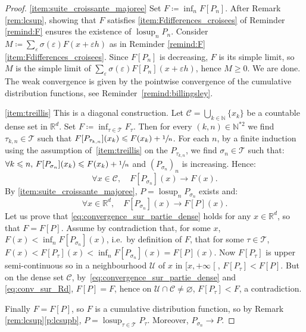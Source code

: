 \documentclass[10pt,a4paper]{article}
\providecommand{\skpt}{\smallskip}
\providecommand{\ie}{i.e.\ }
\theoremstyle{plain}
\theoremstyle{definition}
\newcommand{\Tt}{{\mathcal T}}
\newcommand{\eqdef}{\coloneqq}
\let\eps\varepsilon
\newcommand{\R}{\mathbb{R}}
\newcommand{\N}{\mathbb{N}}
\newcommand{\lcsup}{\operatorname{losup}}
\newcommand{\clo}{\mathclose}
\begin{document}
\skpt
\begin{proof}
\eqref{item:suite_croissante_majoree}
Set $F\eqdef\inf_nF[P_n]$. After Remark \ref{rem:lcsup}, showing that $F$ satisfies \eqref{item:Fdifferences_croisees} of Reminder \ref{remind:F} ensures the existence of $\lcsup_nP_n$. Consider $M\eqdef\sum_{\eps} \sigma(\eps) F(x+\eps h)$ as in Reminder \ref{remind:F}\eqref{item:Fdifferences_croisees}. Since $F[P_n]$ is decreasing, $F$ is its simple limit, so $M$ is the simple limit of $\sum_{\eps} \sigma(\eps) F[P_n](x+\eps h)$, hence $M\geqslant0$. We are done. The weak convergence is given by the pointwise convergence of the cumulative distribution functions, see Reminder~\ref{remind:billingsley}.

\eqref{item:treillis}
This is a diagonal construction. Let $\mathcal{C}=\bigcup_{k\in\N}\{x_k\}$ be a countable dense set in $\R^d$. Set $F\eqdef\inf_{\tau\in\Tt}F_\tau$. Then for every $(k,n)\in\N^{\ast2}$ we find $\tau_{k,n}\in \Tt$ such that $F[P_{\tau_{k,n}}](x_k)\leqslant F(x_k)+\sfrac1n$. For each $n$, by a finite induction using the assumption of~\eqref{item:treillis} on the $P_{\tau_{k,n}}$, we find $\sigma_{n}\in \Tt$ such that: $\forall k\leqslant n,\, F[P_{\sigma_{n}}](x_k)\leqslant F(x_k)+\sfrac1n$ and $(P_{\sigma_n})_n$ is increasing. Hence:
\begin{equation}\label{eq:convergence_sur_partie_dense}
\forall x\in \mathcal{C},\quad F[P_{\sigma_{n}}](x)\to F(x).
\end{equation}
By \eqref{item:suite_croissante_majoree}, $P=\lcsup_n P_{\sigma_n}$ exists and:
\begin{equation}\label{eq:conv_sur_Rd}
\forall x\in \R^d,\quad F[P_{\sigma_{n}}](x)\to F[P](x).
\end{equation}
Let us prove that \eqref{eq:convergence_sur_partie_dense} holds for any $x\in\R^d$, so that $F=F[P]$. Assume by contradiction that, for some $x$, $F(x)<\inf_nF[P_{\sigma_n}](x)$, \ie by definition of $F$, that for some $\tau\in\Tt$, $F(x)<F[P_\tau](x)<\inf_nF[P_{\sigma_n}](x)=F[P](x)$. Now $F[P_\tau]$ is upper semi-continuous so in a neighbourhood $\mathcal{U}$ of $x$ in $[x,+\infty\clo[$, $F[P_\tau]<F[P]$. But on the dense set $\mathcal{C}$, by~\eqref{eq:convergence_sur_partie_dense} and \eqref{eq:conv_sur_Rd}, $F[P]=F$, hence on $\mathcal{U}\cap\mathcal{C}\neq\varnothing$, $F[P_\tau]<F$, a contradiction.

Finally $F=F[P]$, so $F$ is a cumulative distribution function, so by Remark \ref{rem:lcsup}\eqref{p:lcsupb}, $P=\lcsup_{\tau\in\Tt}P_{\tau}$. Moreover, $P_{\sigma_n}\to P$.
\end{proof}
\end{document}
